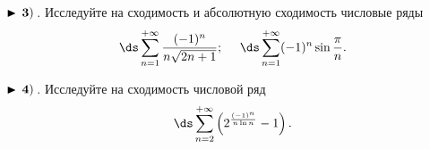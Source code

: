 $\bf\blacktriangleright\,3)\,$. Исследуйте на сходимость и абсолютную сходимость числовые ряды
\begin{equation*}
    \,\ds\sum\limits_{n=1}^{+\infty}\frac{(-1)^n}{n\sqrt{2n+1}}
    ;\quad\,   \,\ds\sum\limits_{n=1}^{+\infty}(-1)^n\sin\frac{\pi}{n}
    .
\end{equation*}


$\bf\blacktriangleright\,4)\,$. Исследуйте на сходимость числовой ряд
\begin{equation*}
    \,\ds\sum\limits_{n=2}^{+\infty}\left(2^{\frac{(-1)^n}{n\ln n}}-1\right)
    .
\end{equation*}

